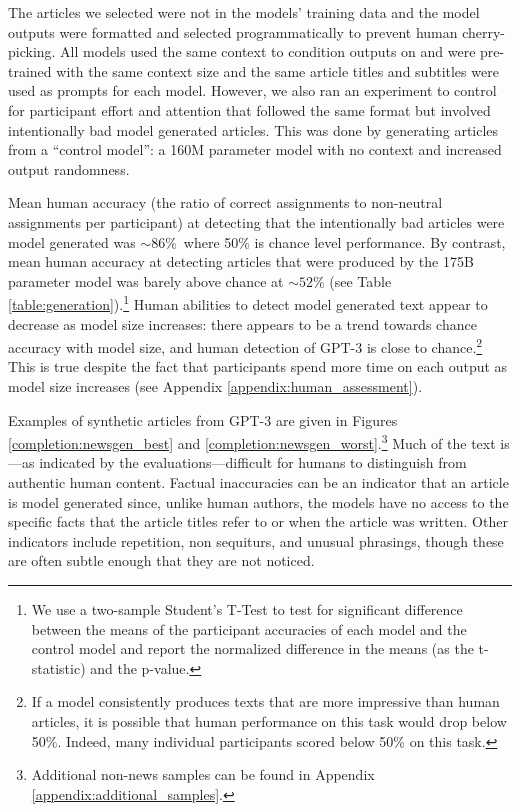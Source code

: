 The articles we selected were not in the models’ training data and the model outputs were formatted and selected programmatically to prevent human cherry-picking. All models used the same context to condition outputs on and were pre-trained with the same context size and the same article titles and subtitles were used as prompts for each model. However, we also ran an experiment to control for participant effort and attention that followed the same format but involved intentionally bad model generated articles. This was done by generating articles from a ``control model'': a 160M parameter model with no context and increased output randomness.

Mean human accuracy (the ratio of correct assignments to non-neutral assignments per participant) at detecting that the intentionally bad articles were model generated was  $\sim86\%$\, where 50\% is chance level performance. By contrast, mean human accuracy at detecting articles that were produced by the 175B parameter model was barely above chance at $\sim52\%$ (see Table \ref{table:generation}).\footnote{We use a two-sample Student’s T-Test to test for significant difference between the means of the participant accuracies of each model and the control model and report the normalized difference in the means (as the t-statistic) and the p-value.} Human abilities to detect model generated text appear to decrease as model size increases: there appears to be a trend towards chance accuracy with model size, and human detection of GPT-3 is close to chance.\footnote{If a model consistently produces texts that are more impressive than human articles, it is possible that human performance on this task would drop below 50\%. Indeed, many individual participants scored below 50\% on this task.} This is true despite the fact that participants spend more time on each output as model size increases (see Appendix \ref{appendix:human_assessment}).

 Examples of synthetic articles from GPT-3 are given in Figures \ref{completion:newsgen_best} and \ref{completion:newsgen_worst}.\footnote{Additional non-news samples can be found in Appendix \ref{appendix:additional_samples}.} Much of the text is---as indicated by the evaluations---difficult for humans to distinguish from authentic human content. Factual inaccuracies can be an indicator that an article is model generated since, unlike human authors, the models have no access to the specific facts that the article titles refer to or when the article was written. Other indicators include repetition, non sequiturs, and unusual phrasings, though these are often subtle enough that they are not noticed. 

